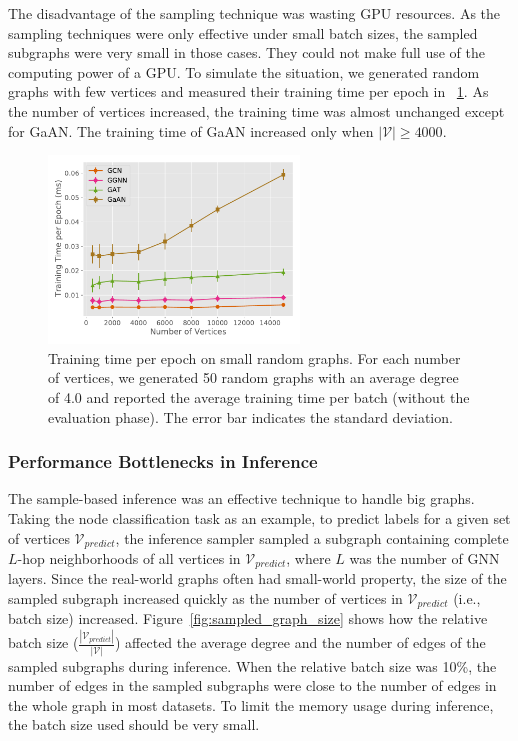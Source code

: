 The disadvantage of the sampling technique was wasting GPU resources.
%
As the sampling techniques were only effective under small batch sizes, the sampled subgraphs were very small in those cases.
%
They could not make full use of the computing power of a GPU.
%
To simulate the situation, we generated random graphs with few vertices and measured their training time per epoch in \figurename~\ref{fig:exp_small_graph_train_time}.
%
As the number of vertices increased, the training time was almost unchanged except for GaAN.
%
The training time of GaAN increased only when $|\mathcal{V}| \geq 4000$.

\begin{figure}[H]
    \centering
    \includegraphics[height=5cm]{figs/experiments/exp_small_graph_train_time.pdf}
    \caption{Training time per epoch on small random graphs. For each number of vertices, we generated 50 random graphs with an average degree of 4.0 and reported the average training time per batch (without the evaluation phase). The error bar indicates the standard deviation.}
    \label{fig:exp_small_graph_train_time}
\end{figure}

\subsubsection{Performance Bottlenecks in Inference}

The sample-based inference was an effective technique to handle big graphs.
%
Taking the node classification task as an example, to predict labels for a given set of vertices $\mathcal{V}_{predict}$, the inference sampler sampled a subgraph containing complete $L$-hop neighborhoods of all vertices in $\mathcal{V}_{predict}$, where $L$ was the number of GNN layers.
%
Since the real-world graphs often had small-world property, the size of the sampled subgraph increased quickly as the number of vertices in $\mathcal{V}_{predict}$ (i.e., batch size) increased.
%
Figure~\ref{fig:sampled_graph_size} shows how the relative batch size ($\frac{|\mathcal{V}_{predict}|}{|\mathcal{V}|}$) affected the average degree and the number of edges of the sampled subgraphs during inference.
%
When the relative batch size was 10\%, the number of edges in the sampled subgraphs were close to the number of edges in the whole graph in most datasets.
%
To limit the memory usage during inference, the batch size used should be very small.

